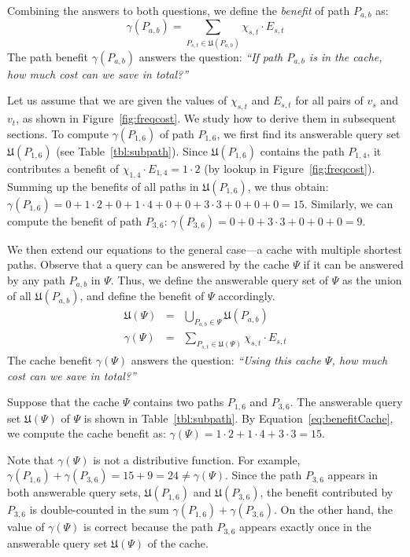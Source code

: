 \documentclass{sig-alternate}
\begin{document}
Combining the answers to both questions, we define the {\em benefit} of path $P_{a,b}$ as:
\begin{equation} \label{eq:benefitPath}
\gamma(P_{a,b}) = \sum_{P_{s,t} \in \mathfrak{U}(P_{a,b})} \chi_{s,t} \cdot E_{s,t}
\end{equation}
The path benefit $\gamma(P_{a,b})$ answers the question: {\em ``If path $P_{a,b}$ is in the cache, how much cost can we save in total?''}




Let us assume that we are given the values of $\chi_{s,t}$ and $E_{s,t}$ for all pairs of $v_s$ and $v_t$,
as shown in Figure~\ref{fig:freqcost}.
We study how to derive them in subsequent sections.
%
To compute $\gamma(P_{1,6})$ of path $P_{1,6}$, we first find its answerable query set $\mathfrak{U}(P_{1,6})$ (see Table~\ref{tbl:subpath}).
Since $\mathfrak{U}(P_{1,6})$ contains the path $P_{1,4}$, it contributes a benefit of
$\chi_{1,4} \cdot E_{1,4} = 1 \cdot 2$ (by lookup in Figure~\ref{fig:freqcost}).
Summing up the benefits of all paths in $\mathfrak{U}(P_{1,6})$, we thus obtain:
$\gamma(P_{1,6})=0+1\cdot2+0+1\cdot4+0+0+3\cdot3+0+0+0=15$.
Similarly, we can compute the benefit of path $P_{3,6}$:
$\gamma(P_{3,6})=0+0+3\cdot3+0+0+0=9$.




We then extend our equations to the general case---a cache with multiple shortest paths.
Observe that a query can be answered by the cache $\Psi$ if it can be answered
by any path $P_{a,b}$ in $\Psi$.
Thus, we define the answerable query set of $\Psi$ as the union of all $\mathfrak{U}( P_{a,b} )$,
and define the benefit of $\Psi$ accordingly.
\begin{eqnarray} \label{eq:upsi}
 \mathfrak{U}(\Psi) & = &  \bigcup_{ P_{a,b} \in \Psi} \mathfrak{U}( P_{a,b} ) \\
 \label{eq:benefitCache}
 \gamma(\Psi) &  = &  \sum_{P_{s,t} \in \mathfrak{U}(\Psi)} \chi_{s,t} \cdot E_{s,t}
\end{eqnarray}
The cache benefit $\gamma(\Psi)$ answers the question: {\em ``Using this cache $\Psi$, how much cost can we save in total?''}


Suppose that the cache $\Psi$ contains two paths $P_{1,6}$ and $P_{3,6}$.
The answerable query set $\mathfrak{U}(\Psi)$ of $\Psi$ is shown in Table~\ref{tbl:subpath}.
By Equation~\ref{eq:benefitCache}, we compute the cache benefit as:
$\gamma(\Psi) = 1\cdot2 + 1\cdot4 + 3\cdot3 = 15$.


Note that $\gamma(\Psi)$ is not a distributive function.
For example, $\gamma(P_{1,6}) + \gamma(P_{3,6}) = 15 + 9 = 24 \ne \gamma(\Psi)$.
%
Since the path $P_{3,6}$ appears in both answerable query sets,
$\mathfrak{U}(P_{1,6})$ and $\mathfrak{U}(P_{3,6})$,
the benefit contributed by $P_{3,6}$ is double-counted in the sum $\gamma(P_{1,6}) + \gamma(P_{3,6})$.
%
On the other hand, the value of $\gamma(\Psi)$ is correct because
the path $P_{3,6}$ appears exactly once in the answerable query set $\mathfrak{U}(\Psi)$ of the cache.
\end{document}
